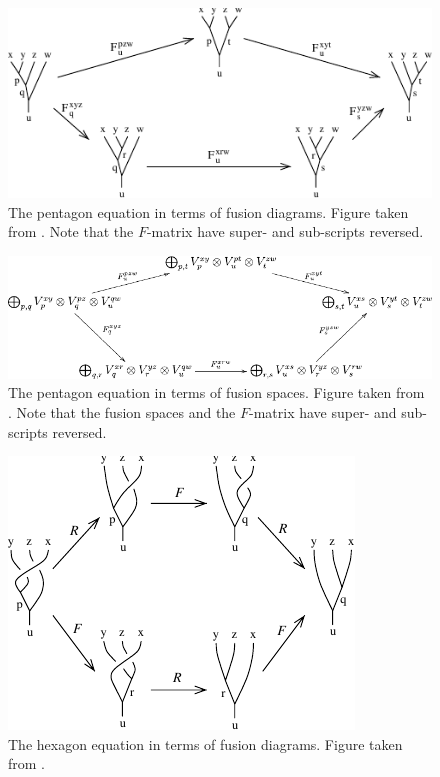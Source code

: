 \begin{figure}[!htb]
  \centering
  \includegraphics[width=1\linewidth]{img/pentagon_diagram.pdf}
  \caption{The pentagon equation in terms of fusion diagrams. Figure taken from \cite{kitaev}. Note that the $F$-matrix have super- and sub-scripts reversed.}
  \label{fig:pentagon_diagram}
\end{figure}

\begin{figure}[!htb]
  \centering
  \includegraphics[width=1\linewidth]{img/pentagon_space.pdf}
  \caption{The pentagon equation in terms of fusion spaces. Figure taken from \cite{kitaev}. Note that the fusion spaces and the $F$-matrix have super- and sub-scripts reversed.}
  \label{fig:pentagon_space}
\end{figure}

\begin{figure}[!htb]
  \centering
  \includegraphics[width=0.8\linewidth]{img/hexagon_diagram.pdf}
  \caption{The hexagon equation in terms of fusion diagrams. Figure taken from \cite{kitaev}.}
  \label{fig:hexagon_diagram}
\end{figure}

